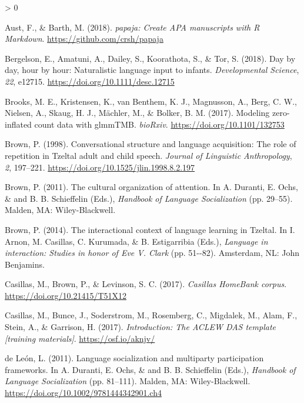 \documentclass[
  english,
  ,man,floatsintext]{apa6}
\newlength{\cslhangindent}
\newenvironment{CSLReferences}[2] %
 {%
  \setlength{\parindent}{0pt}
  \ifodd #1 \everypar{\setlength{\hangindent}{\cslhangindent}}\ignorespaces\fi
  \ifnum #2 > 0
  \setlength{\parskip}{#2\baselineskip}
  \fi
 }%
 {}
\begin{document}
\hypertarget{refs}{}
\begin{CSLReferences}{1}{0}
\leavevmode\hypertarget{ref-R-papaja}{}%
Aust, F., \& Barth, M. (2018). \emph{{papaja}: {Create} {APA} manuscripts with {R Markdown}}. \url{https://github.com/crsh/papaja}

\leavevmode\hypertarget{ref-bergelson2018day}{}%
Bergelson, E., Amatuni, A., Dailey, S., Koorathota, S., \& Tor, S. (2018). Day by day, hour by hour: Naturalistic language input to infants. \emph{Developmental Science}, \emph{22}, e12715. \url{https://doi.org/10.1111/desc.12715}

\leavevmode\hypertarget{ref-brooks2017modeling}{}%
Brooks, M. E., Kristensen, K., van Benthem, K. J., Magnusson, A., Berg, C. W., Nielsen, A., Skaug, H. J., Mächler, M., \& Bolker, B. M. (2017). Modeling zero-inflated count data with glmmTMB. \emph{bioRxiv}. \url{https://doi.org/10.1101/132753}

\leavevmode\hypertarget{ref-brown1998conversational}{}%
Brown, P. (1998). Conversational structure and language acquisition: The role of repetition in {T}zeltal adult and child speech. \emph{Journal of Linguistic Anthropology}, \emph{2}, 197--221. \url{https://doi.org/10.1525/jlin.1998.8.2.197}

\leavevmode\hypertarget{ref-brown2011cultural}{}%
Brown, P. (2011). The cultural organization of attention. In A. Duranti, E. Ochs, \& and B. B. Schieffelin (Eds.), \emph{Handbook of {Language Socialization}} (pp. 29--55). Malden, MA: Wiley-Blackwell.

\leavevmode\hypertarget{ref-brown2014interactional}{}%
Brown, P. (2014). The interactional context of language learning in {T}zeltal. In I. Arnon, M. Casillas, C. Kurumada, \& B. Estigarribia (Eds.), \emph{Language in interaction: Studies in honor of {Eve V. Clark}} (pp. 51-\/-82). Amsterdam, NL: John Benjamins.

\leavevmode\hypertarget{ref-Casillas-HB}{}%
Casillas, M., Brown, P., \& Levinson, S. C. (2017). \emph{Casillas {HomeBank} corpus}. \url{https://doi.org/10.21415/T51X12}

\leavevmode\hypertarget{ref-casillas2017ACLEWDAS}{}%
Casillas, M., Bunce, J., Soderstrom, M., Rosemberg, C., Migdalek, M., Alam, F., Stein, A., \& Garrison, H. (2017). \emph{Introduction: {The ACLEW DAS} template {[}training materials{]}}. \url{https://osf.io/aknjv/}

\leavevmode\hypertarget{ref-deleon2011language}{}%
de León, L. (2011). Language socialization and multiparty participation frameworks. In A. Duranti, E. Ochs, \& and B. B. Schieffelin (Eds.), \emph{Handbook of {Language Socialization}} (pp. 81--111). Malden, MA: Wiley-Blackwell. \url{https://doi.org/10.1002/9781444342901.ch4}


\end{CSLReferences}
\end{document}
